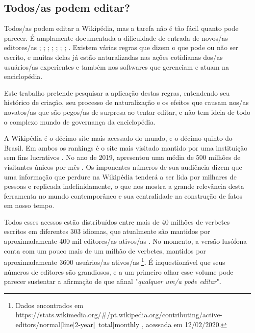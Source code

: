 \subsection{Todos/as podem editar?}

Todos/as podem editar a Wikipédia, mas a tarefa não é tão fácil quanto pode parecer. É amplamente documentada a dificuldade de entrada de novos/as editores/as \citep{antin_my_2011}; \citep{burke_feed_2009}; \citep{faulkner_etiquette_2012}; \citep{halfaker_rise_2013}; \citep{kraut_dealing_2010}; \citep{morgan_tea_2013}; \citep{schneider_accept_2014}; \citep{steinmacher_social_2015}. Existem várias regras que dizem o que pode ou não ser escrito, e muitas delas já estão naturalizadas nas ações cotidianas dos/as usuários/as experientes e também nos softwares que gerenciam e atuam na enciclopédia.

Este trabalho pretende pesquisar a aplicação destas regras, entendendo seu histórico de criação, seu processo de naturalização e os efeitos que causam nos/as novatos/as que são pegos/as de surpresa ao tentar editar, e não tem ideia de todo o complexo mundo de governança da enciclopédia.

A Wikipédia é o décimo site mais acessado do mundo, e o décimo-quinto do Brasil. Em ambos os rankings é o site mais visitado mantido por uma instituição sem fins lucrativos \citep{alexa_2019}. No ano de 2019, apresentou uma média de 500 milhões de visitantes únicos por mês \citep{wikimedia_stats_2019}. Os imponentes números de sua audiência dizem que uma informação que perdure na Wikipédia tenderá a ser lida por milhares de pessoas e replicada indefinidamente, o que nos mostra a grande relevância desta ferramenta no mundo contemporâneo e sua centralidade na construção de fatos em nosso tempo.

Todos esses acessos estão distribuídos entre mais de 40 milhões de verbetes escritos em diferentes 303 idiomas, que atualmente são mantidos por aproximadamente 400 mil editores/as ativos/as \citep{wikimedia_stats_2019}. No momento, a versão lusófona conta com um pouco mais de um milhão de verbetes, mantidos por aproximadamente 3600 usuários/as ativos/as \citep{wikimedia_stats_2020}\footnote{Dados encontrados em https://stats.wikimedia.org/\#/pt.wikipedia.org/contributing/active-editors/normal|line|2-year|~total|monthly , acessada em 12/02/2020.}. É inquestionável que seus números de editores são grandiosos, e a um primeiro olhar esse volume pode parecer sustentar a afirmação de que afinal "\textit{qualquer um/a pode editar}".


